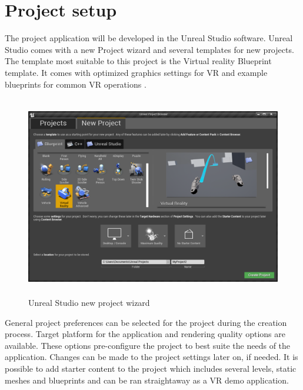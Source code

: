 \documentclass[12pt, a4paper,oneside, nocenter]{thesis}
\begin{document}
\section{Project setup}
The project application will be developed in the Unreal Studio software. Unreal Studio comes with a new Project wizard and several templates for new projects. The template most suitable to this project is the Virtual reality Blueprint template. It comes with optimized graphics settings for VR and example blueprints for common VR operations .
\begin{figure}[H]
	\includegraphics[height=250pt]{new-project}
	\caption{Unreal Studio new project wizard}
	\label{fig:new-project}
\end{figure}
General project preferences can be selected for the project during the creation process. Target platform for the application and rendering quality options are available. These options pre-configure the project to best suite the needs of the application. Changes can be made to the project settings later on, if needed. It is possible to add starter content to the project which includes several levels, static meshes and blueprints and can be ran straightaway as a VR demo application.
\end{document}
